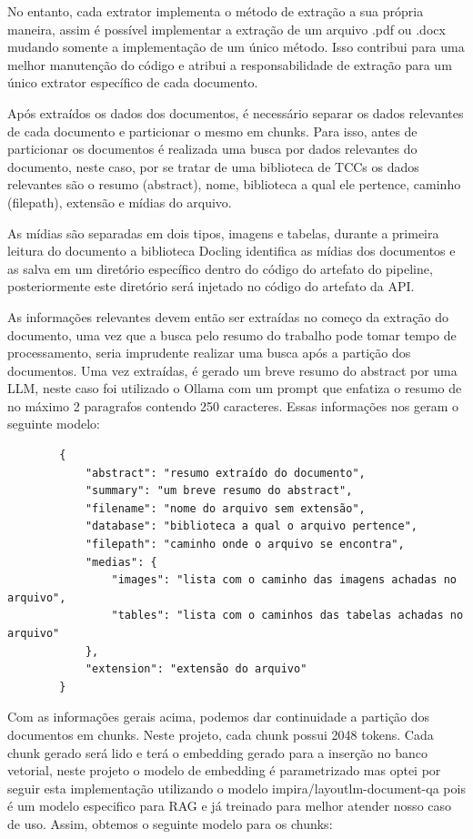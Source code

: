 \documentclass[a4paper, 12pt]{article}
\begin{document}
    No entanto, cada extrator implementa o método de extração a sua própria maneira, assim é possível implementar a extração de um arquivo .pdf ou .docx mudando somente a implementação de um único método. Isso contribui para uma melhor manutenção do código e atribui a responsabilidade de extração para um único extrator específico de cada documento.

    Após extraídos os dados dos documentos, é necessário separar os dados relevantes de cada documento e particionar o mesmo em chunks. Para isso, antes de particionar os documentos é realizada uma busca por dados relevantes do documento, neste caso, por se tratar de uma biblioteca de TCCs os dados relevantes são o resumo (abstract), nome, biblioteca a qual ele pertence, caminho (filepath), extensão e mídias do arquivo.

    As mídias são separadas em dois tipos, imagens e tabelas, durante a primeira leitura do documento a biblioteca Docling identifica as mídias dos documentos e as salva em um diretório específico dentro do código do artefato do pipeline, posteriormente este diretório será injetado no código do artefato da API.

    As informações relevantes devem então ser extraídas no começo da extração do documento, uma vez que a busca pelo resumo do trabalho pode tomar tempo de processamento, seria imprudente realizar uma busca após a partição dos documentos. Uma vez extraídas, é gerado um breve resumo do abstract por uma LLM, neste caso foi utilizado o Ollama com um prompt que enfatiza o resumo de no máximo 2 paragrafos contendo 250 caracteres. Essas informações nos geram o seguinte modelo:

    \begin{lstlisting}
        {
            "abstract": "resumo extraído do documento",
            "summary": "um breve resumo do abstract",
            "filename": "nome do arquivo sem extensão",
            "database": "biblioteca a qual o arquivo pertence",
            "filepath": "caminho onde o arquivo se encontra",
            "medias": {
                "images": "lista com o caminho das imagens achadas no arquivo",
                "tables": "lista com o caminhos das tabelas achadas no arquivo"
            },
            "extension": "extensão do arquivo"
        }
    \end{lstlisting}

    Com as informações gerais acima, podemos dar continuidade a partição dos documentos em chunks. Neste projeto, cada chunk possui 2048 tokens. Cada chunk gerado será lido e terá o embedding gerado para a inserção no banco vetorial, neste projeto o modelo de embedding é parametrizado mas optei por seguir esta implementação utilizando o modelo impira/layoutlm-document-qa pois é um modelo especifico para RAG e já treinado para melhor atender nosso caso de uso. Assim, obtemos o seguinte modelo para os chunks:
\end{document}
